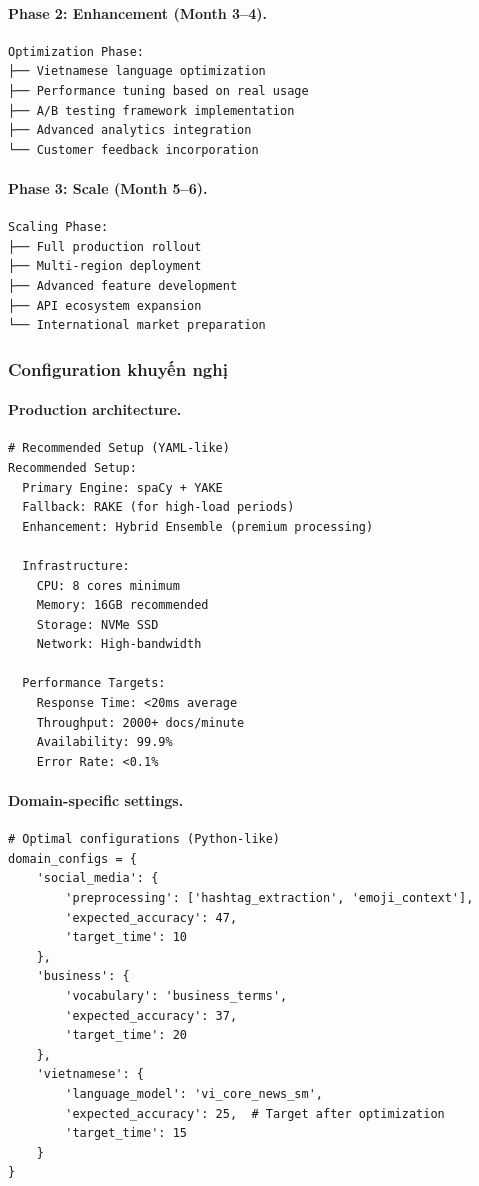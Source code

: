 \paragraph{Phase 2: Enhancement (Month 3--4).}
\begin{verbatim}
Optimization Phase:
├── Vietnamese language optimization
├── Performance tuning based on real usage
├── A/B testing framework implementation
├── Advanced analytics integration
└── Customer feedback incorporation
\end{verbatim}

\paragraph{Phase 3: Scale (Month 5--6).}
\begin{verbatim}
Scaling Phase:
├── Full production rollout
├── Multi-region deployment
├── Advanced feature development
├── API ecosystem expansion
└── International market preparation
\end{verbatim}

\subsubsection{Configuration khuyến nghị}

\paragraph{Production architecture.}
\begin{verbatim}
# Recommended Setup (YAML-like)
Recommended Setup:
  Primary Engine: spaCy + YAKE
  Fallback: RAKE (for high-load periods)
  Enhancement: Hybrid Ensemble (premium processing)

  Infrastructure:
    CPU: 8 cores minimum
    Memory: 16GB recommended
    Storage: NVMe SSD
    Network: High-bandwidth

  Performance Targets:
    Response Time: <20ms average
    Throughput: 2000+ docs/minute
    Availability: 99.9%
    Error Rate: <0.1%
\end{verbatim}

\paragraph{Domain-specific settings.}
\begin{verbatim}
# Optimal configurations (Python-like)
domain_configs = {
    'social_media': {
        'preprocessing': ['hashtag_extraction', 'emoji_context'],
        'expected_accuracy': 47,
        'target_time': 10
    },
    'business': {
        'vocabulary': 'business_terms',
        'expected_accuracy': 37,
        'target_time': 20
    },
    'vietnamese': {
        'language_model': 'vi_core_news_sm',
        'expected_accuracy': 25,  # Target after optimization
        'target_time': 15
    }
}
\end{verbatim}

